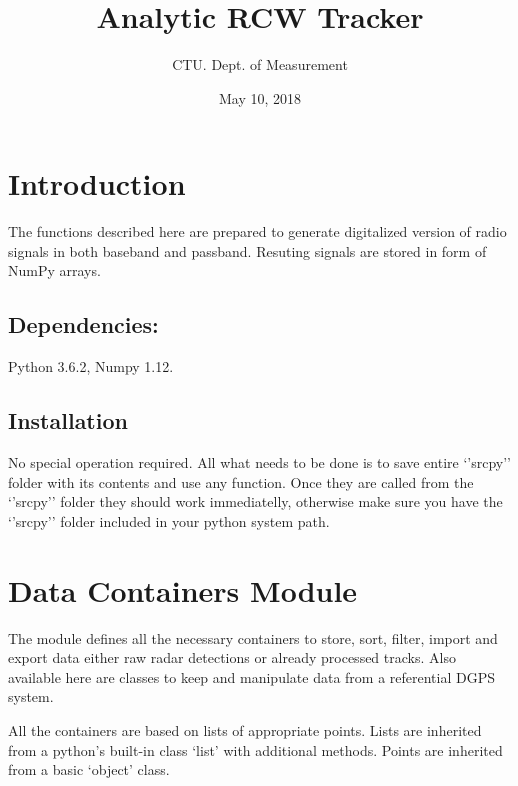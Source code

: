 \documentclass[letterpaper,10pt,english]{Reference manual}
\title{Analytic RCW Tracker}
\date{May 10, 2018}
\author{CTU. Dept. of Measurement}
\begin{document}
\maketitle
\sphinxtableofcontents
{}\label{\detokenize{index::doc}}



\chapter{Introduction}
\label{\detokenize{intro::doc}}\label{\detokenize{intro:welcome-to-automotive-rear-looking-radar-tracker-s-documentation}}\label{\detokenize{intro:introduction}}
The functions described here are prepared to generate digitalized version of radio signals in both baseband and passband. Resuting signals are stored in form of NumPy arrays.


\section{Dependencies:}
\label{\detokenize{intro:dependencies}}
Python 3.6.2, Numpy 1.12.


\section{Installation}
\label{\detokenize{intro:installation}}
No special operation required. All what needs to be done is to save entire ‘’srcpy’’ folder with its contents and use any function. Once they are called from the ‘’srcpy’’ folder they should work immediatelly, otherwise make sure you have the ‘’srcpy’’ folder included in your python system path.


\chapter{Data Containers Module}
\label{\detokenize{datacontainers:trackpoint-label}}\label{\detokenize{datacontainers::doc}}\label{\detokenize{datacontainers:data-containers-module}}
The module defines all the necessary containers to store, sort, filter, import and export data
either raw radar detections or already processed tracks. Also available here are classes to keep
and manipulate data from a referential DGPS system.

All the containers are based on lists of appropriate points. Lists are inherited from a python’s built-in
class ‘list’ with additional methods. Points are inherited from a basic ‘object’ class.
\label{\detokenize{datacontainers:module-data_containers}}
\end{document}
